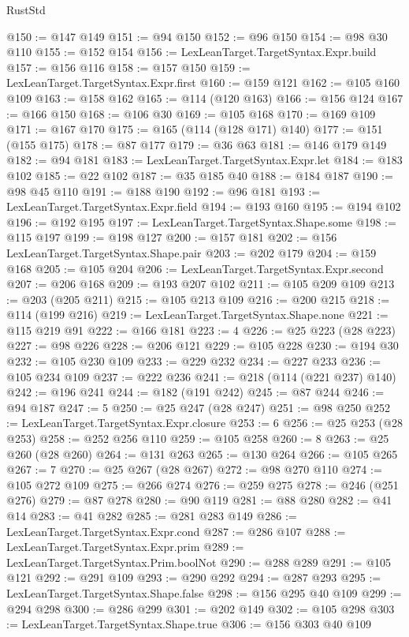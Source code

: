 \begin{lexlean}{RustStd}
\begin{coremodule}
{\begin{coremodule}
{{{{{{{{{{{{{{{{{{{{{{{{{{{{{{{{{{@150 := @147 @149
@151 := @94 @150
@152 := @96 @150
@154 := @98 @30 @110
@155 := @152 @154
@156 := LexLeanTarget.TargetSyntax.Expr.build
@157 := @156 @116
@158 := @157 @150
@159 := LexLeanTarget.TargetSyntax.Expr.first
@160 := @159 @121
@162 := @105 @160 @109
@163 := @158 @162
@165 := @114 (@120 @163)
@166 := @156 @124
@167 := @166 @150
@168 := @106 @30
@169 := @105 @168
@170 := @169 @109
@171 := @167 @170
@175 := @165 (@114 (@128 @171) @140)
@177 := @151 (@155 @175)
@178 := @87 @177
@179 := @36 @63
@181 := @146 @179 @149
@182 := @94 @181
@183 := LexLeanTarget.TargetSyntax.Expr.let
@184 := @183 @102
@185 := @22 @102
@187 := @35 @185 @40
@188 := @184 @187
@190 := @98 @45 @110
@191 := @188 @190
@192 := @96 @181
@193 := LexLeanTarget.TargetSyntax.Expr.field
@194 := @193 @160
@195 := @194 @102
@196 := @192 @195
@197 := LexLeanTarget.TargetSyntax.Shape.some
@198 := @115 @197
@199 := @198 @127
@200 := @157 @181
@202 := @156 LexLeanTarget.TargetSyntax.Shape.pair
@203 := @202 @179
@204 := @159 @168
@205 := @105 @204
@206 := LexLeanTarget.TargetSyntax.Expr.second
@207 := @206 @168
@209 := @193 @207 @102
@211 := @105 @209 @109
@213 := @203 (@205 @211)
@215 := @105 @213 @109
@216 := @200 @215
@218 := @114 (@199 @216)
@219 := LexLeanTarget.TargetSyntax.Shape.none
@221 := @115 @219 @91
@222 := @166 @181
@223 := 4
@226 := @25 @223 (@28 @223)
@227 := @98 @226
@228 := @206 @121
@229 := @105 @228
@230 := @194 @30
@232 := @105 @230 @109
@233 := @229 @232
@234 := @227 @233
@236 := @105 @234 @109
@237 := @222 @236
@241 := @218 (@114 (@221 @237) @140)
@242 := @196 @241
@244 := @182 (@191 @242)
@245 := @87 @244
@246 := @94 @187
@247 := 5
@250 := @25 @247 (@28 @247)
@251 := @98 @250
@252 := LexLeanTarget.TargetSyntax.Expr.closure
@253 := 6
@256 := @25 @253 (@28 @253)
@258 := @252 @256 @110
@259 := @105 @258
@260 := 8
@263 := @25 @260 (@28 @260)
@264 := @131 @263
@265 := @130 @264
@266 := @105 @265
@267 := 7
@270 := @25 @267 (@28 @267)
@272 := @98 @270 @110
@274 := @105 @272 @109
@275 := @266 @274
@276 := @259 @275
@278 := @246 (@251 @276)
@279 := @87 @278
@280 := @90 @119
@281 := @88 @280
@282 := @41 @14
@283 := @41 @282
@285 := @281 @283 @149
@286 := LexLeanTarget.TargetSyntax.Expr.cond
@287 := @286 @107
@288 := LexLeanTarget.TargetSyntax.Expr.prim
@289 := LexLeanTarget.TargetSyntax.Prim.boolNot
@290 := @288 @289
@291 := @105 @121
@292 := @291 @109
@293 := @290 @292
@294 := @287 @293
@295 := LexLeanTarget.TargetSyntax.Shape.false
@298 := @156 @295 @40 @109
@299 := @294 @298
@300 := @286 @299
@301 := @202 @149
@302 := @105 @298
@303 := LexLeanTarget.TargetSyntax.Shape.true
@306 := @156 @303 @40 @109
}}}}}}}}}}}}}}}}}}}}}}}}}}}}}}}}}}
\end{coremodule}}
\end{coremodule}
\end{lexlean}
